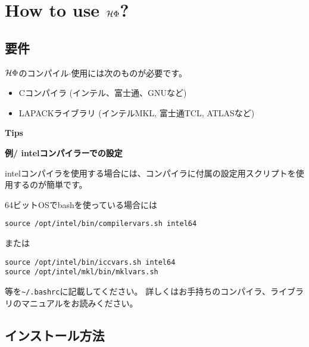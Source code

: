 \chapter{How to use $\mathcal{H} \Phi$?}
\label{Ch:HowTo}

\section{要件}

$\mathcal{H} \Phi$のコンパイル$\cdot$使用には次のものが必要です。
\begin{itemize}
\item Cコンパイラ (インテル、富士通、GNUなど)
\item LAPACKライブラリ (インテルMKL, 富士通TCL, ATLASなど)
\end{itemize}

\begin{screen}
\Large 
{\bf Tips}
\normalsize

{\bf 例/ intelコンパイラーでの設定}

intelコンパイラを使用する場合には、コンパイラに付属の設定用スクリプトを使用するのが簡単です。

64ビットOSでbashを使っている場合には
\begin{verbatim}
source /opt/intel/bin/compilervars.sh intel64
\end{verbatim}
または
\begin{verbatim}
source /opt/intel/bin/iccvars.sh intel64
source /opt/intel/mkl/bin/mklvars.sh
\end{verbatim}
等を\verb|~/.bashrc|に記載してください。
詳しくはお手持ちのコンパイラ、ライブラリのマニュアルをお読みください。

\end{screen}


\section{インストール方法}

\label{Sec:HowToInstall}
